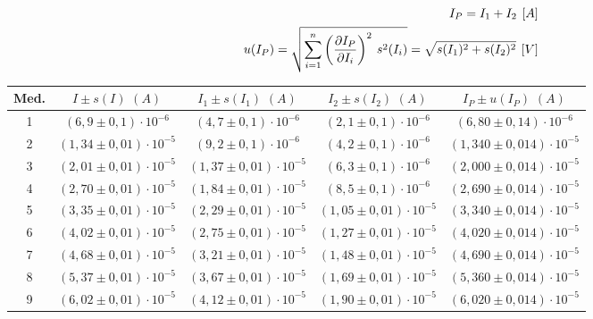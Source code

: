 \documentclass[11pt]{report}
\begin{document}
\begin{refsection}
\begin{equation}
\begin{split}
    I_P= I_1 + I_2 \hspace{4pt} [A] \\
    u(I_P)=\sqrt{\sum^n_{i=1} \left( \frac{\partial I_P}{\partial I_i} \right)^2\hspace{2 pt} s^2(I_i)}=\sqrt{s(I_1)^2+s(I_2)^2}
     \hspace{4pt}[V]
    \label{eq:intensidades}
\end{split}
\end{equation}

\begin{table}[H]
\centering
\begin{tabular}{|c|c|c|c|c|}
\hline
Med. & $I \pm s(I)\hspace{4pt}(A)$ & $I_1 \pm s(I_1)\hspace{4pt}(A)$ & $I_2 \pm s(I_2)\hspace{4pt}(A)$ & $I_P \pm u(I_P)\hspace{4pt}(A)$ \\
\hline
1 & $(6,9 \pm 0,1) \cdot 10^{-6}$ & $(4,7 \pm 0,1) \cdot 10^{-6}$ & $(2,1 \pm 0,1) \cdot 10^{-6}$ &  $(6,80 \pm 0,14) \cdot 10^{-6}$\\
2 & $(1,34 \pm 0,01) \cdot 10^{-5}$ & $(9,2 \pm 0,1) \cdot 10^{-6}$ & $(4,2 \pm 0,1) \cdot 10^{-6}$ &  $(1,340 \pm 0,014) \cdot 10^{-5}$\\
3 & $(2,01 \pm 0,01) \cdot 10^{-5}$ & $(1,37 \pm 0,01) \cdot 10^{-5}$ & $(6,3 \pm 0,1) \cdot 10^{-6}$ &  $(2,000 \pm 0,014) \cdot 10^{-5}$\\
4 & $(2,70 \pm 0,01) \cdot 10^{-5}$ & $(1,84 \pm 0,01) \cdot 10^{-5}$ & $(8,5 \pm 0,1) \cdot 10^{-6}$ &$(2,690 \pm 0,014) \cdot 10^{-5}$\\
5 & $(3,35 \pm 0,01) \cdot 10^{-5}$ & $(2,29 \pm 0,01) \cdot 10^{-5}$ & $(1,05 \pm 0,01) \cdot 10^{-5}$ &$(3,340 \pm 0,014) \cdot 10^{-5}$\\
6 & $(4,02 \pm 0,01) \cdot 10^{-5}$ & $(2,75 \pm 0,01) \cdot 10^{-5}$ & $(1,27 \pm 0,01) \cdot 10^{-5}$ & $(4,020 \pm 0,014) \cdot 10^{-5}$\\
7 & $(4,68 \pm 0,01) \cdot 10^{-5}$ & $(3,21 \pm 0,01) \cdot 10^{-5}$ & $(1,48 \pm 0,01) \cdot 10^{-5}$ & $(4,690 \pm 0,014) \cdot 10^{-5}$\\
8 & $(5,37 \pm 0,01) \cdot 10^{-5}$ & $(3,67 \pm 0,01) \cdot 10^{-5}$ & $(1,69 \pm 0,01) \cdot 10^{-5}$ & $(5,360 \pm 0,014) \cdot 10^{-5}$\\
9 & $(6,02 \pm 0,01) \cdot 10^{-5}$ & $(4,12 \pm 0,01) \cdot 10^{-5}$ & $(1,90 \pm 0,01) \cdot 10^{-5}$ & $(6,020 \pm 0,014) \cdot 10^{-5}$\\

\end{tabular}
\end{table}
\end{refsection}
\end{document}
